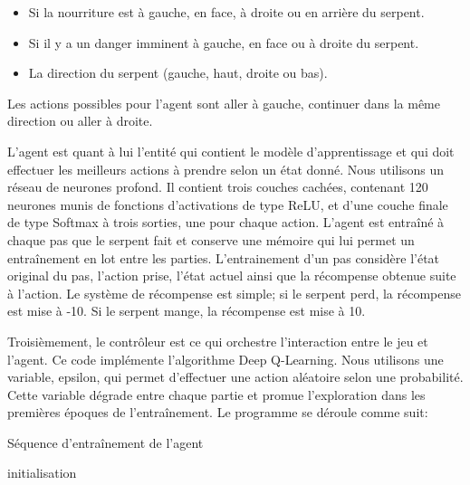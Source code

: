 \documentclass{article}
\begin{document}
\begin{itemize}
	\item Si la nourriture est à gauche, en face, à droite ou en arrière du serpent.
	\item Si il y a un danger imminent à gauche, en face ou à droite du serpent.
	\item La direction du serpent (gauche, haut, droite ou bas).
\end{itemize}

Les actions possibles pour l'agent sont aller à gauche, continuer dans la même direction ou aller à droite.

L’agent est quant à lui l’entité qui contient le modèle d’apprentissage et qui doit effectuer les meilleurs actions à prendre selon un état donné. Nous utilisons un réseau de neurones profond. Il contient trois couches cachées, contenant 120 neurones munis de fonctions d'activations de type ReLU, et d’une couche finale de type Softmax à trois sorties, une pour chaque action. L’agent est entraîné à chaque pas que le serpent fait et conserve une mémoire qui lui permet un entraînement en lot entre les parties. L’entrainement d’un pas considère l’état original du pas, l’action prise, l’état actuel ainsi que la récompense obtenue suite à l’action. Le système de récompense est simple; si le serpent perd, la récompense est mise à -10. Si le serpent mange, la récompense est mise à 10.

Troisièmement, le contrôleur est ce qui orchestre l'interaction entre le jeu et l’agent. Ce code implémente l’algorithme Deep Q-Learning. Nous utilisons une variable, epsilon, qui permet d’effectuer une action aléatoire selon une probabilité. Cette variable dégrade entre chaque partie et promue l’exploration dans les premières époques de l’entraînement. Le programme se déroule comme suit:

\begin{algorithm}
\caption{Séquence d'entraînement de l'agent}
initialisation\;
\end{algorithm}
\end{document}
